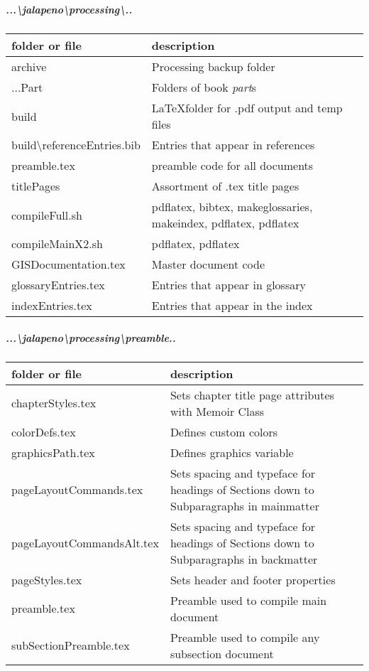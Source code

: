 \begin{adjmulticols}{1}{\innerMar}{\outerMar}
\begin{tabular}{p{6cm} | p{9cm} }
\end{tabular}
\subparagraph*{}
\subparagraph*{...\textbackslash jalapeno\textbackslash processing\textbackslash..}
\begin{tabular}{p{6cm}| p{9cm} }
{\footnotesize folder or file} & {\footnotesize description }\\ \hline
archive & Processing backup folder\\
...Part & Folders of book \textit{part}s\\
build & \LaTeX{}folder for .pdf output and temp files \\
build\textbackslash referenceEntries.bib & Entries that appear in references\\
preamble.tex & preamble code for all documents\\
titlePages & Assortment of .tex title pages\\
compileFull.sh & {\scriptsize pdflatex, bibtex, makeglossaries, makeindex, pdflatex, pdflatex}\\
compileMainX2.sh & pdflatex, pdflatex\\
GISDocumentation.tex & Master document code\\
glossaryEntries.tex & Entries that appear in glossary\\
indexEntries.tex & Entries that appear in the index\\
\end{tabular}
\subparagraph*{...\textbackslash jalapeno\textbackslash processing\textbackslash preamble..}
\begin{tabular}{p{6cm}| p{9cm} }
{\footnotesize folder or file} & {\footnotesize description }\\ \hline
chapterStyles.tex & {\scriptsize Sets chapter title page attributes with Memoir Class}\\
colorDefs.tex & Defines custom colors\\
graphicsPath.tex & Defines graphics variable\\
pageLayoutCommands.tex & {\scriptsize Sets spacing and typeface for headings of Sections down to Subparagraphs in mainmatter}\\
pageLayoutCommandsAlt.tex & {\scriptsize Sets spacing and typeface for headings of Sections down to Subparagraphs in backmatter}\\
pageStyles.tex & Sets header and footer properties\\
preamble.tex & {\scriptsize Preamble used to compile main document}\\
subSectionPreamble.tex & {\scriptsize Preamble used to compile any subsection document}\\
\end{tabular}
\end{adjmulticols}
\clearpage

